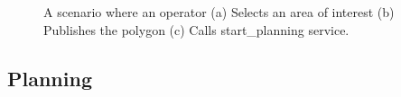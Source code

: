 \begin{figure}
	\centering
	\caption[Operator interaction with pegasus system; a scenerio.]{\small 
		A scenario where an operator (a) Selects an area of interest (b) Publishes the polygon (c) Calls start\_planning service.}
	
	
	
	
	
	\label{fig:presentation-scenerio-1}
\end{figure}


\subsection{Planning}

